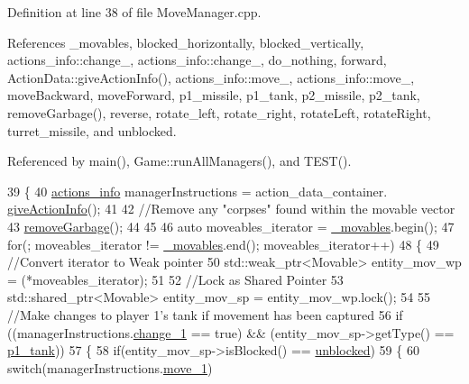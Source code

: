 Definition at line 38 of file Move\-Manager.\-cpp.



References \-\_\-movables, blocked\-\_\-horizontally, blocked\-\_\-vertically, actions\-\_\-info\-::change\-\_, actions\-\_\-info\-::change\-\_, do\-\_\-nothing, forward, Action\-Data\-::give\-Action\-Info(), actions\-\_\-info\-::move\-\_, actions\-\_\-info\-::move\-\_, move\-Backward, move\-Forward, p1\-\_\-missile, p1\-\_\-tank, p2\-\_\-missile, p2\-\_\-tank, remove\-Garbage(), reverse, rotate\-\_\-left, rotate\-\_\-right, rotate\-Left, rotate\-Right, turret\-\_\-missile, and unblocked.



Referenced by main(), Game\-::run\-All\-Managers(), and T\-E\-S\-T().


\begin{DoxyCode}
39 \{
40     \hyperlink{structactions__info}{actions\_info} managerInstructions = action\_data\_container.
      \hyperlink{classActionData_ab2f5b210968c91a01ed1439904b3ffee}{giveActionInfo}();
41 
42     \textcolor{comment}{//Remove any "corpses" found within the movable vector}
43     \hyperlink{classMoveManager_a543e6c5900c59fc90ccef88a1317430a}{removeGarbage}();
44 
45 
46     \textcolor{keyword}{auto} moveables\_iterator = \hyperlink{classMoveManager_a7fc3d147dbcc1df9e2099e193bca489d}{\_movables}.begin();
47     \textcolor{keywordflow}{for}(; moveables\_iterator != \hyperlink{classMoveManager_a7fc3d147dbcc1df9e2099e193bca489d}{\_movables}.end(); moveables\_iterator++)
48     \{
49         \textcolor{comment}{//Convert iterator to Weak pointer}
50         std::weak\_ptr<Movable> entity\_mov\_wp = (*moveables\_iterator);
51 
52         \textcolor{comment}{//Lock as Shared Pointer}
53         std::shared\_ptr<Movable> entity\_mov\_sp = entity\_mov\_wp.lock();
54 
55         \textcolor{comment}{//Make changes to player 1's tank if movement has been captured}
56         \textcolor{keywordflow}{if} ((managerInstructions.\hyperlink{structactions__info_a69ac673533838f973f09492a12516816}{change\_1} == \textcolor{keyword}{true}) && (entity\_mov\_sp->getType() == 
      \hyperlink{Structures_8h_a6d8f83e710b27d4f86c45f0bb77066e3a31fa78b2b7dd774f5158a16ef230932e}{p1\_tank}))
57         \{
58             \textcolor{keywordflow}{if}(entity\_mov\_sp->isBlocked() == \hyperlink{Structures_8h_a6fef29d9424addfa69bdd2a379424896a1596fbf6035468467c790068b609ced3}{unblocked})
59             \{
60                 \textcolor{keywordflow}{switch}(managerInstructions.\hyperlink{structactions__info_a5cb853144009b2bfb7e58c7bf43e2a42}{move\_1})

\end{DoxyCode}
